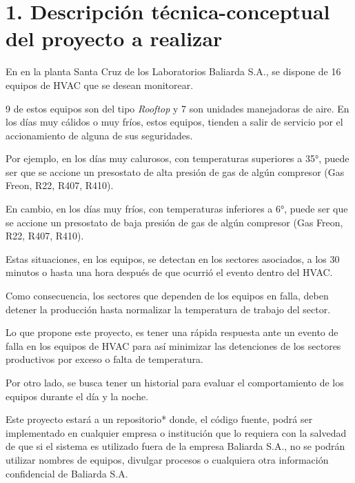 \documentclass[
11pt, %
codirector, %
]{charter}
\begin{document}
\section{1. Descripción técnica-conceptual del proyecto a realizar}
\label{sec:descripcion}


En en la planta Santa Cruz de los Laboratorios Baliarda S.A., se dispone de 16 equipos de HVAC que se desean monitorear.\par 
9 de estos equipos son del tipo \textit{Rooftop} y 7 son unidades manejadoras de aire.
 En los días muy cálidos o muy fríos, estos equipos, tienden a salir de servicio por el accionamiento de alguna de sus seguridades. \par 
Por ejemplo, en los días muy calurosos, con temperaturas superiores a 35°, puede ser que se accione un presostato de alta presión de gas de algún compresor (Gas Freon, R22, R407, R410). \par 
En cambio, en los días muy fríos, con temperaturas inferiores a 6°, puede ser que se accione un presostato de baja presión de gas de algún compresor (Gas Freon, R22, R407, R410). \par 
 Estas situaciones, en los equipos, se detectan en los sectores asociados, a los 30 minutos o hasta una hora después de que ocurrió el evento dentro del HVAC. \par 
Como consecuencia, los sectores que dependen de los equipos en falla, deben detener la producción hasta normalizar la temperatura de trabajo del sector. \par 
 Lo que propone este proyecto, es tener una rápida respuesta ante un evento de falla en los equipos de HVAC para así minimizar las detenciones de los sectores productivos por exceso o falta de temperatura. \par 
Por otro lado, se busca tener un historial para evaluar el comportamiento de los equipos durante el día y la noche.\par 
Este proyecto estará a un repositorio* donde, el código fuente, podrá ser implementado en cualquier empresa o institución que lo requiera con la salvedad de que si el sistema es utilizado fuera de la empresa Baliarda S.A., no se podrán utilizar nombres de equipos, divulgar procesos o cualquiera otra información confidencial de Baliarda S.A. \par 
\end{document}
